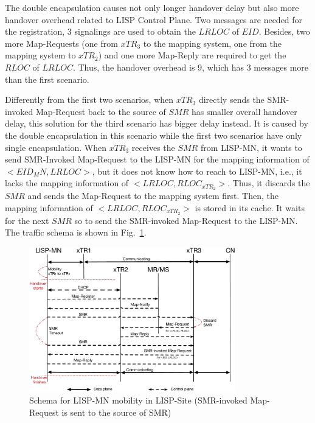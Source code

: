 The double encapsulation causes not only longer handover delay but also more handover overhead related to LISP Control Plane. Two messages are needed for the registration, 3 signalings are used to obtain the $LRLOC$ of $EID$. Besides, two more Map-Requests (one from $xTR_3$ to the mapping system, one from the mapping system to $xTR_2$) and one more Map-Reply are required to get the $RLOC$ of $LRLOC$. Thus, the handover overhead is 9, which has 3 messages more than the first scenario.

Differently from the first two scenarios, when $xTR_3$ directly sends the SMR-invoked Map-Request back to the source of $SMR$ has smaller overall handover delay, this solution for the third scenario has bigger delay instead. It is caused by the double encapsulation in this scenario while the first two scenarios have only single encapsulation. When $xTR_3$ receives the $SMR$ from LISP-MN, it wants to send SMR-Invoked Map-Request to the LISP-MN for the mapping information of $<EID_MN, LRLOC>$, but it does not know how to reach to LISP-MN, i.e., it lacks the mapping information of $<LRLOC, RLOC_{xTR_2}>$. Thus, it discards the $SMR$ and sends the Map-Request to the mapping system first. Then, the mapping information of $<LRLOC, RLOC_{xTR_2}>$ is stored in its cache. It waits for the next $SMR$ so to send the SMR-invoked Map-Request to the LISP-MN. The traffic schema is shown in Fig.~\ref{Mobility_double_encap_schema_SMR_askxTR_simplify}.
\begin{figure}[!t]
	\centering
	\includegraphics[width=0.8\textwidth]{Pics/Mobility_double_encap_schema_SMR_askxTR_simplify}
	\caption{Schema for LISP-MN mobility in LISP-Site (SMR-invoked Map-Request is sent to the source of SMR)}
	\label{Mobility_double_encap_schema_SMR_askxTR_simplify}
\end{figure}

